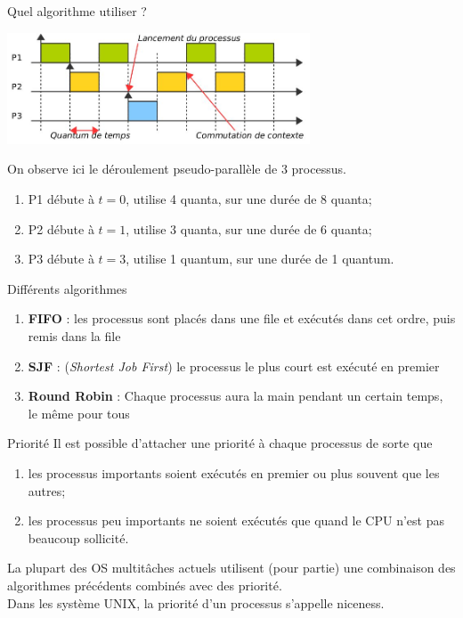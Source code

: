 \documentclass[10pt]{beamer}
\begin{document}
\begin{frame}{Quel algorithme utiliser ?}
\begin{center}
\includegraphics[width=9cm]{img/3proc}
\end{center}
On observe ici le déroulement \alert{pseudo-parallèle} de 3 processus.
\begin{enumerate}[--]
	\item P1 débute à $t=0$, utilise 4 quanta, sur une durée de 8 quanta;
    \item P2 débute à $t=1$, utilise 3 quanta, sur une durée de 6 quanta;
    \item P3 débute à $t=3$, utilise 1 quantum, sur une durée de 1 quantum.
\end{enumerate}
\end{frame}
\begin{frame}{Différents algorithmes}

\begin{enumerate}[--]
	\item \textbf{FIFO} : les processus sont placés dans une file et exécutés dans cet ordre, puis remis dans la file
    \item \textbf{SJF} : (\textit{Shortest Job First}) le processus le plus court est exécuté en premier
    \item \textbf{Round Robin} : Chaque processus aura la main pendant un certain temps, le même pour tous
\end{enumerate}
\end{frame}
\begin{frame}{Priorité}
Il est possible d'attacher une priorité à chaque processus de sorte que
\begin{enumerate}[--]
	\item les processus importants soient exécutés en premier ou plus souvent que les autres;
    \item les processus peu importants ne soient exécutés que quand le CPU n'est pas beaucoup sollicité.
\end{enumerate}

La plupart des OS multitâches actuels utilisent (pour partie) une combinaison des algorithmes précédents combinés avec des priorité.\\
Dans les système \textsc{UNIX}, la priorité d'un processus s'appelle \alert{niceness}.
\end{frame}
\end{document}
